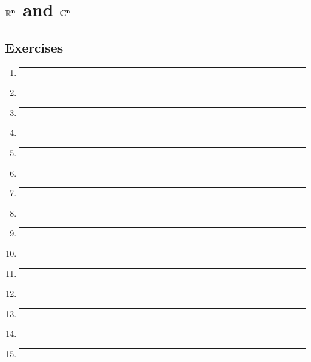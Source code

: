 \section{$\mathbf{\mathbb{R}^n}$ and $\mathbf{\mathbb{C}^n}$}
\subsection{Exercises}

\begin{enumerate}[label=\textbf{\arabic*}]

\item{
  \lipsum[66]
  \bigbreak
  \hrule
  \bigbreak
}

\item{
\lipsum[75]
\bigbreak
\hrule
\bigbreak
}

\item{
  \lipsum[74]
  \bigbreak
  \hrule
  \bigbreak
}

\item{
  \lipsum[64]
  \bigbreak
  \hrule
  \bigbreak
}

\item{
  \lipsum[2]
  \bigbreak
  \hrule
  \bigbreak
}

\item{
  \lipsum[3]
  \bigbreak
  \hrule
  \bigbreak
}

\item{
  \lipsum[4]
  \bigbreak
  \hrule
  \bigbreak
}

\item{
  \lipsum[17]
  \bigbreak
  \hrule
  \bigbreak
}

\item{
  \lipsum[6]
  \bigbreak
  \hrule
  \bigbreak
}

\item{
  \lipsum[7]
  \bigbreak
  \hrule
  \bigbreak
}

\item{
  \lipsum[8]
  \bigbreak
  \hrule
  \bigbreak
}

\item{
  \lipsum[13] %
  \bigbreak
  \hrule
  \bigbreak
}

\item{
  \lipsum[10]
  \bigbreak
  \hrule
  \bigbreak
}

\item{
  \lipsum[11]
  \bigbreak
  \hrule
  \bigbreak
}

\item{
  \lipsum[12]
  \bigbreak
  \hrule
  \bigbreak
}



\end{enumerate}